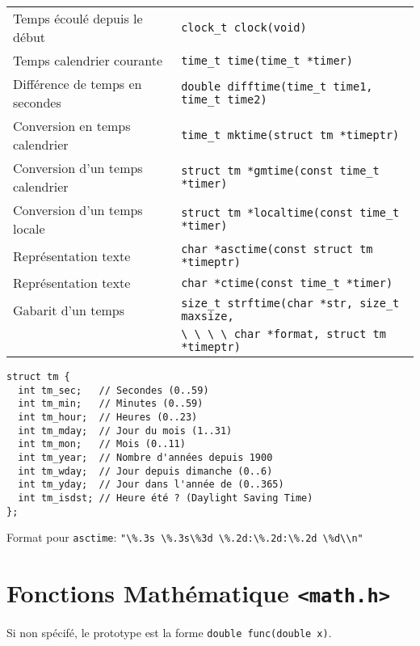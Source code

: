 \documentclass{article}
\newcommand{\cd}{\lstinline}
\begin{document}
\begin{multicols*}{3}
\begin{tabularx}{\linewidth}{Xl}
  Temps écoulé depuis le début & \cd{clock_t clock(void)} \\
  Temps calendrier courante & \cd{time_t time(time_t *timer)} \\
  Différence de temps en secondes & \cd{double difftime(time_t time1, time_t time2)} \\
  Conversion en temps calendrier & \cd{time_t mktime(struct tm *timeptr)} \\
  Conversion d'un temps calendrier & \cd{struct tm *gmtime(const time_t *timer)} \\
  Conversion d'un temps locale & \cd{struct tm *localtime(const time_t *timer)} \\
  Représentation texte & \cd{char *asctime(const struct tm *timeptr)} \\
  Représentation texte & \cd{char *ctime(const time_t *timer)} \\
  Gabarit d'un temps & \cd{size_t strftime(char *str, size_t maxsize,} \\
                     & \cd{\ \ \ \ char *format, struct tm *timeptr)} \\
\end{tabularx}

{
\small
\begin{lstlisting}
struct tm {
  int tm_sec;   // Secondes (0..59)
  int tm_min;   // Minutes (0..59)
  int tm_hour;  // Heures (0..23)
  int tm_mday;  // Jour du mois (1..31)
  int tm_mon;   // Mois (0..11)
  int tm_year;  // Nombre d'années depuis 1900
  int tm_wday;  // Jour depuis dimanche (0..6)
  int tm_yday;  // Jour dans l'année de (0..365)
  int tm_isdst; // Heure été ? (Daylight Saving Time)
};
\end{lstlisting}
}

Format pour \texttt{asctime}: \cd{"\%.3s \%.3s\%3d \%.2d:\%.2d:\%.2d \%d\\n"}

\section*{Fonctions Mathématique \texttt{<math.h>}}

Si non spécifé, le prototype est la forme \cd{double func(double x)}.


\end{multicols*}
\end{document}
